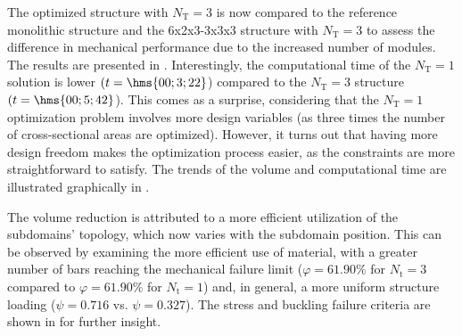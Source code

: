 The optimized structure with $N_\text{T}=3$ is now compared to the reference monolithic structure and the 6x2x3-3x3x3 structure with $N_\text{T}=3$ to assess the difference in mechanical performance due to the increased number of modules. The results are presented in . Interestingly, the computational time of the $N_\text{T}=1$ solution is lower $(t = \hms{00;3;22}$) compared to the $N_\text{T}=3$ structure $(t = \hms{00;5;42}$). This comes as a surprise, considering that the $N_\text{T}=1$ optimization problem involves more design variables (as three times the number of cross-sectional areas are optimized). However, it turns out that having more design freedom makes the optimization process easier, as the constraints are more straightforward to satisfy. The trends of the volume and computational time are illustrated graphically in .

The volume reduction is attributed to a more efficient utilization of the subdomains' topology, which now varies with the subdomain position. This can be observed by examining the more efficient use of material, with a greater number of bars reaching the mechanical failure limit ($\varphi = 61.90\%$ for $N_\text{t} = 3$ compared to $\varphi = 61.90\%$ for $N_\text{t} = 1$) and, in general, a more uniform structure loading ($\psi = 0.716$ vs. $\psi = 0.327$). The stress and buckling failure criteria are shown in  for further insight.


